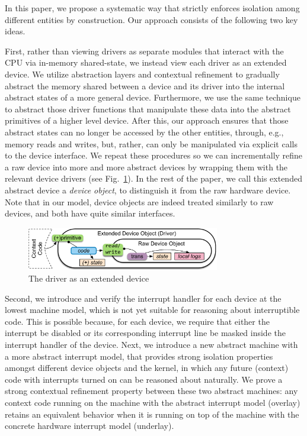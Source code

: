 In this paper, we propose a systematic way that strictly
enforces isolation among different entities by construction.
Our approach consists of the following two key ideas. 

First, rather than viewing drivers as separate modules that interact
with the CPU via in-memory shared-state, we instead view each driver
as an extended device.  We utilize abstraction layers and contextual
refinement to gradually abstract the memory shared between a device
and its driver into the internal abstract states of a more general
device. Furthermore, we use the same technique to abstract those
driver functions that manipulate these data into the abstract
primitives of a higher level device. After this, our approach ensures
that those abstract states can no longer be accessed by the other
entities, through, e.g., memory reads and writes, but, rather, can
only be manipulated via explicit calls to the device interface. We
repeat these procedures so we can incrementally refine a raw device into
more and more abstract devices by wrapping them with the relevant
device drivers (see Fig.~\ref{fig:driver}). In the rest of the
paper, we call this extended abstract device a {\it device object}, to
distinguish it from the raw hardware device. Note that in our model,
device objects are indeed treated similarly to raw devices, and both
have quite similar interfaces.

\begin{figure}[t]
	\begin{center}
		\includegraphics[width=0.75\textwidth]{figs/extends}
	\end{center}
	\caption{The driver as an extended device}
	\label{fig:driver}
\end{figure}

Second, we introduce and verify the interrupt handler for each device
at the lowest machine model, which is not yet suitable for reasoning
about interruptible code. This is possible because, for each device,
we require that either the interrupt be disabled or its corresponding
interrupt line be masked inside the
interrupt handler of the device. Next, we introduce a new abstract
machine with a more abstract interrupt model, that provides strong
isolation properties amongst different device objects and the kernel,
in which any future (context) code with interrupts turned on can be
reasoned about naturally. We prove a strong contextual refinement
property between these two abstract machines: any context code running
on the machine with the abstract interrupt model (overlay) retains an
equivalent behavior when it is running on top of the machine with the
concrete hardware interrupt model (underlay).

